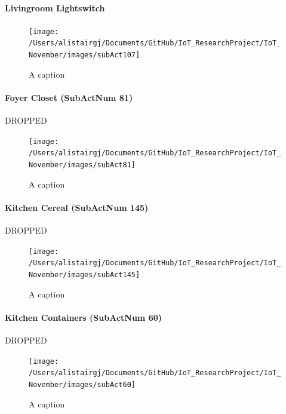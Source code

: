 \documentclass[11pt,]{article}
\let\oldparagraph\paragraph
\renewcommand{\paragraph}[1]{\oldparagraph{#1}\mbox{}}
\begin{document}
\hypertarget{livingroom-lightswitch}{%
\paragraph{Livingroom Lightswitch}\label{livingroom-lightswitch}}

\begin{figure}[H]
\texttt{[image: /Users/alistairgj/Documents/GitHub/IoT\_ResearchProject/IoT\_November/images/subAct107]} \caption{A caption}\label{fig:subAct107}
\end{figure}

\hypertarget{foyer-closet-subactnum-81}{%
\paragraph{Foyer Closet (SubActNum
81)}\label{foyer-closet-subactnum-81}}

DROPPED

\begin{figure}[H]
\texttt{[image: /Users/alistairgj/Documents/GitHub/IoT\_ResearchProject/IoT\_November/images/subAct81]} \caption{A caption}\label{fig:subAct81}
\end{figure}

\hypertarget{kitchen-cereal-subactnum-145}{%
\paragraph{Kitchen Cereal (SubActNum
145)}\label{kitchen-cereal-subactnum-145}}

DROPPED

\begin{figure}[H]
\texttt{[image: /Users/alistairgj/Documents/GitHub/IoT\_ResearchProject/IoT\_November/images/subAct145]} \caption{A caption}\label{fig:subAct145}
\end{figure}

\hypertarget{kitchen-containers-subactnum-60}{%
\paragraph{Kitchen Containers (SubActNum
60)}\label{kitchen-containers-subactnum-60}}

DROPPED

\begin{figure}[H]
\texttt{[image: /Users/alistairgj/Documents/GitHub/IoT\_ResearchProject/IoT\_November/images/subAct60]} \caption{A caption}\label{fig:subAct60}
\end{figure}
\end{document}
